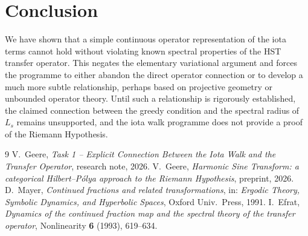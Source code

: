 \documentclass[11pt,a4paper]{article}
\begin{document}
\section{Conclusion}
We have shown that a simple continuous operator representation of the iota terms cannot hold without violating known spectral properties of the HST transfer operator.  This negates the elementary variational argument and forces the programme to either abandon the direct operator connection or to develop a much more subtle relationship, perhaps based on projective geometry or unbounded operator theory.  Until such a relationship is rigorously established, the claimed connection between the greedy condition and the spectral radius of \(L_s\) remains unsupported, and the iota walk programme does not provide a proof of the Riemann Hypothesis.

\begin{thebibliography}{9}
 V.\ Geere, \emph{Task 1 -- Explicit Connection Between the Iota Walk and the Transfer Operator}, research note, 2026.
 V.\ Geere, \emph{Harmonic Sine Transform: a categorical Hilbert--Pólya approach to the Riemann Hypothesis}, preprint, 2026.
 D.\ Mayer, \emph{Continued fractions and related transformations}, in: \textit{Ergodic Theory, Symbolic Dynamics, and Hyperbolic Spaces}, Oxford Univ.\ Press, 1991.
 I.\ Efrat, \emph{Dynamics of the continued fraction map and the spectral theory of the transfer operator}, Nonlinearity \textbf{6} (1993), 619--634.
\end{thebibliography}
\end{document}

